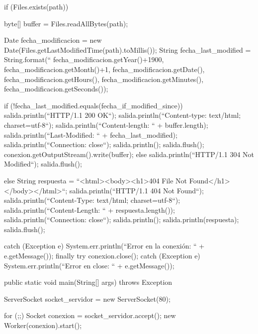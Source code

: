 \documentclass[11pt,a4paper,oneside]{book}
\begin{document}
\begin{SourceCode}
{{{{{	        if (Files.exists(path))
	        {
	          byte[] buffer = Files.readAllBytes(path);

	          Date fecha_modificacion = new Date(Files.getLastModifiedTime(path).toMillis());
	          String fecha_last_modified = String.format(``%
						  fecha_modificacion.getYear()+1900,
						  fecha_modificacion.getMonth()+1,
						  fecha_modificacion.getDate(),
						  fecha_modificacion.getHours(),
						  fecha_modificacion.getMinutes(),
						  fecha_modificacion.getSeconds());

	          if (!fecha_last_modified.equals(fecha_if_modified_since))
	          {
              salida.println(``HTTP/1.1 200 OK``);
              salida.println(``Content-type: text/html; charset=utf-8``);
              salida.println(``Content-length: `` + buffer.length);
              salida.println(``Last-Modified: `` + fecha_last_modified);
              salida.println(``Connection: close``);
              salida.println();
              salida.flush();
	            conexion.getOutputStream().write(buffer);
	          }
	          else
	          {
              salida.println(``HTTP/1.1 304 Not Modified``);
              salida.flush();
	          }
	        }
	        else
	        {
	          String respuesta = ``<html><body><h1>404 File Not Found</h1></body></html>``;
	          salida.println(``HTTP/1.1 404 Not Found``);
	          salida.println(``Content-Type: text/html; charset=utf-8``);
	          salida.println(``Content-Length: `` + respuesta.length());
	          salida.println(``Connection: close``);
	          salida.println();
	          salida.println(respuesta);
	          salida.flush();
	        }
        }
      }
      catch (Exception e)
      {
        System.err.println(``Error en la conexión: `` + e.getMessage());
      }
      finally
      {
        try
        {
          conexion.close();
        }
        catch (Exception e)
        {
          System.err.println(``Error en close: `` + e.getMessage());
        }
      }
    }
  }

  public static void main(String[] args) throws Exception
  {
    ServerSocket socket_servidor = new ServerSocket(80);

    for (;;)
    {
      Socket conexion = socket_servidor.accept();
      new Worker(conexion).start();
    }
  }
}
\end{SourceCode}
\end{document}
